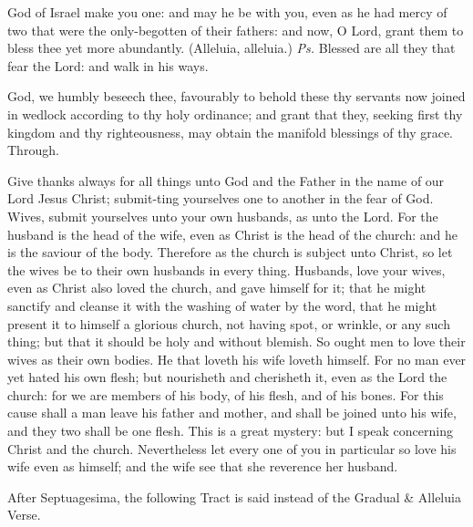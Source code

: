  God of Israel make you one: and may he be with you, even as he had mercy of two that were the only-begotten of their fathers: and now, O Lord, grant them to bless thee yet more abundantly. (Alleluia, alleluia.) \textit{Ps.} Blessed are all they that fear the Lord: and walk in his ways.

 God, we humbly beseech thee, favourably to behold these thy servants now joined in wedlock according to thy holy ordinance; and grant that they, seeking first thy kingdom and thy righteousness, may obtain the manifold blessings of thy grace. Through.
 
 Give thanks always for all things unto God and the Father in the name of our Lord Jesus Christ; submit-ting yourselves one to another in the fear of God. Wives, submit yourselves unto your own husbands, as unto the Lord. For the husband is the head of the wife, even as Christ is the head of the church: and he is the saviour of the body. Therefore as the church is subject unto Christ, so let the wives be to their own husbands in every thing. Husbands, love your wives, even as Christ also loved the church, and gave himself for it; that he might sanctify and cleanse it with the washing of water by the word, that he might present it to himself a glorious church, not having spot, or wrinkle, or any such thing; but that it should be holy and without blemish. So ought men to love their wives as their own bodies. He that loveth his wife loveth himself. For no man ever yet hated his own flesh; but nourisheth and cherisheth it, even as the Lord the church: for we are members of his body, of his flesh, and of his bones. For this cause shall a man leave his father and mother, and shall be joined unto his wife, and they two shall be one flesh. This is a great mystery: but I speak concerning Christ and the church. Nevertheless let every one of you in particular so love his wife even as himself; and the wife see that she reverence her husband.


\begin{rubric}
    After Septuagesima, the following Tract is said instead of the Gradual \& Alleluia Verse.
\end{rubric}

